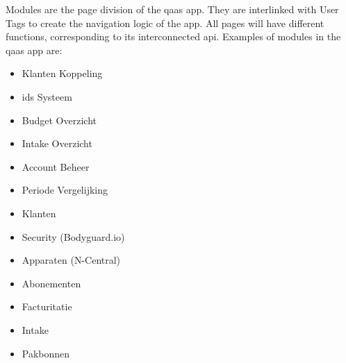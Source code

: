 


Modules are the page division of the \acrshort{qaas} app. They are interlinked with User Tags to create the navigation logic of the app.
All pages will have different functions, corresponding to its interconnected \acrshort{api}. Examples of modules in the \acrshort{qaas} app
are:

\begin{itemize}
      \item Klanten Koppeling
      \item \acrshort{ids} Systeem
      \item Budget Overzicht
      \item Intake Overzicht
      \item Account Beheer
      \item Periode Vergelijking
      \item Klanten
      \item Security (Bodyguard.io)
      \item Apparaten (N-Central)
      \item Abonementen
      \item Facturitatie
      \item Intake
      \item Pakbonnen
\end{itemize}


